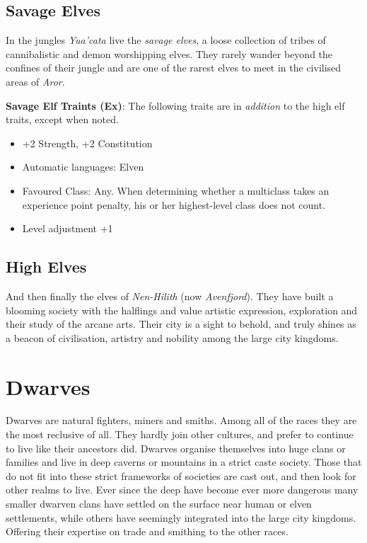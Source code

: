\subsection*{Savage Elves}

In the jungles \emph{Yua'cata} live the \emph{savage elves}, a loose
collection of tribes of cannibalistic and demon worshipping elves. They rarely
wander beyond the confines of their jungle and are one of the rarest elves to
meet in the civilised areas of \emph{Aror}.

\begin{35e}
  \textbf{Savage Elf Traints (Ex)}: The following traits are in \emph{addition}
  to the high elf traits, except when noted.
  \begin{itemize}[noitemsep]
    \item +2 Strength, +2 Constitution
    \item Automatic languages: Elven
    \item Favoured Class: Any. When determining whether a multiclass takes an
    experience point penalty, his or her highest-level class does not count.
    \item Level adjustment +1
  \end{itemize}
\end{35e}

\subsection*{High Elves}

And then finally the elves of \emph{Nen-Hilith} (now \emph{Avenfjord}). They
have built a blooming society with the halflings and value artistic expression,
exploration and their study of the arcane arts. Their city is a sight to behold,
and truly shines as a beacon of civilisation, artistry and nobility among the
large city kingdoms.

\section*{Dwarves}

Dwarves are natural fighters, miners and smiths. Among all of the races they
are the most reclusive of all. They hardly join other cultures, and prefer to
continue to live like their ancestors did. Dwarves organise themselves into
huge clans or families and live in deep caverns or mountains in a strict caste
society. Those that do not fit into these strict frameworks of societies are
cast out, and then look for other realms to live. Ever since the deep have
become ever more dangerous many smaller dwarven clans have settled on the
surface near human or elven settlements, while others have seemingly integrated
into the large city kingdoms. Offering their expertise on trade and smithing
to the other races.

